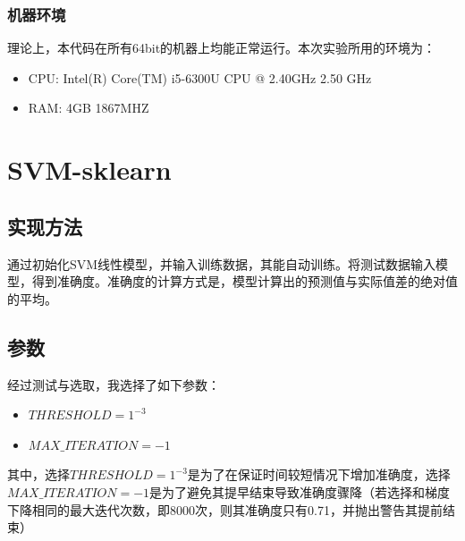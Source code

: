 \documentclass[UTF8]{ctexart}
\begin{document}
\subsubsection{机器环境}
理论上，本代码在所有64bit的机器上均能正常运行。本次实验所用的环境为：
\begin{itemize}
    \item CPU: Intel(R) Core(TM) i5-6300U CPU @ 2.40GHz   2.50 GHz
    \item RAM: 4GB 1867MHZ
\end{itemize}
\section{SVM-sklearn}
\subsection{实现方法}
通过初始化SVM线性模型，并输入训练数据，其能自动训练。将测试数据输入模型，得到准确度。准确度的计算方式是，模型计算出的预测值与实际值差的绝对值的平均。
\subsection{参数}
经过测试与选取，我选择了如下参数：
\begin{itemize}
    \item $THRESHOLD = 1^{-3}$
    \item $MAX\_ITERATION = -1$
\end{itemize}
其中，选择$THRESHOLD = 1^{-3}$是为了在保证时间较短情况下增加准确度，选择$MAX\_ITERATION = -1$是为了避免其提早结束导致准确度骤降（若选择和梯度下降相同的最大迭代次数，即8000次，则其准确度只有0.71，并抛出警告其提前结束）
\end{document}

